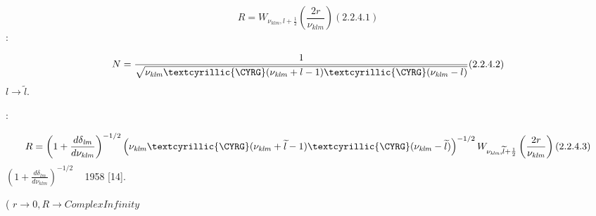 \documentclass[a4paper]{article}
\begin{document}
{\CYRD}{\cyrl}{\cyrya} {\cyrn}{\cyra}{\cyrs} {\cyrn}{\cyra}{\cyri}{\cyrb}{\cyro}{\cyrl}{\cyre}{\cyre}
{\cyrp}{\cyro}{\cyrd}{\cyrh}{\cyro}{\cyrd}{\cyrya}{\cyrshch}{\cyri}{\cyrm} {\cyrb}{\cyru}{\cyrd}{\cyre}{\cyrt}
{\cyrr}{\cyre}{\cyrsh}{\cyre}{\cyrn}{\cyri}{\cyre}

\begin{equation*}
R=W_{\nu _{\mathit{klm}},l+\frac 1 2}\left(\frac{2r}{\nu _{\mathit{klm}}}\right)(2.2.4.1)
\end{equation*}
{\CYRP}{\cyrr}{\cyri} {\cyrerev}{\cyrt}{\cyro}{\cyrm}
{\cyrn}{\cyro}{\cyrr}{\cyrm}{\cyri}{\cyrr}{\cyro}{\cyrv}{\cyro}{\cyrch}{\cyrn}{\cyrery}{\cyrishrt}
{\cyrf}{\cyra}{\cyrk}{\cyrt}{\cyro}{\cyrr} {\cyrb}{\cyru}{\cyrd}{\cyre}{\cyrt}:

\begin{equation*}
N=\frac 1{\sqrt{\nu _{\mathit{klm}}\text{\textcyrillic{{\CYRG}}}(\nu
_{\mathit{klm}}+l-1)\text{\textcyrillic{{\CYRG}}}(\nu _{\mathit{klm}}-l)}}(2.2.4.2)
\end{equation*}
{\CYRV} {\cyrn}{\cyra}{\cyrsh}{\cyri}{\cyrh} {\cyrr}{\cyra}{\cyrs}{\cyrch}{\cyre}{\cyrt}{\cyra}{\cyrh}  $l\rightarrow
\widetilde l$.

{\CYRK}{\cyro}{\cyrn}{\cyre}{\cyrch}{\cyrn}{\cyrery}{\cyrishrt} {\cyrv}{\cyri}{\cyrd}
{\cyrr}{\cyra}{\cyrd}{\cyri}{\cyra}{\cyrl}{\cyrsftsn}{\cyrn}{\cyro}{\cyrishrt} {\cyrch}{\cyra}{\cyrs}{\cyrt}{\cyri}
{\cyrb}{\cyru}{\cyrd}{\cyre}{\cyrt} {\cyrs}{\cyrl}{\cyre}{\cyrd}{\cyru}{\cyryu}{\cyrshch}{\cyri}{\cyrm}:

\begin{equation*}
R=\left(1+\frac{d\delta _{\mathit{lm}}}{d\nu _{\mathit{klm}}}\right)^{-1/2}\left(\nu
_{\mathit{klm}}\text{\textcyrillic{{\CYRG}}}(\nu _{\mathit{klm}}+\widetilde l-1)\text{\textcyrillic{{\CYRG}}}(\nu
_{\mathit{klm}}-\widetilde l)\right)^{-1/2}W_{\nu _{\mathit{klm}},\widetilde l+\frac 1 2}\left(\frac{2r}{\nu
_{\mathit{klm}}}\right)(2.2.4.3)
\end{equation*}
{\CYRN}{\cyro}{\cyrr}{\cyrm}{\cyri}{\cyrr}{\cyro}{\cyrv}{\cyro}{\cyrch}{\cyrn}{\cyrery}{\cyrishrt}
{\cyrf}{\cyra}{\cyrk}{\cyrt}{\cyro}{\cyrr}  $\left(1+\frac{d\delta _{\mathit{lm}}}{d\nu _{\mathit{klm}}}\right)^{-1/2}$
{\cyrb}{\cyrery}{\cyrl} {\cyrp}{\cyrr}{\cyre}{\cyrd}{\cyrl}{\cyro}{\cyrzh}{\cyre}{\cyrn} {\cyri}
{\cyrv}{\cyrery}{\cyrv}{\cyre}{\cyrd}{\cyre}{\cyrn} {\CYRS}{\cyri}{\cyrt}{\cyro}{\cyrn}{\cyro}{\cyrm} \ {\cyrv}
{\cyrs}{\cyrt}{\cyra}{\cyrt}{\cyrsftsn}{\cyre} 1958 [14].

{\CYRR}{\cyra}{\cyrs}{\cyrs}{\cyrm}{\cyro}{\cyrt}{\cyrr}{\cyri}{\cyrm}
{\cyro}{\cyrt}{\cyrd}{\cyre}{\cyrl}{\cyrsftsn}{\cyrn}{\cyro} {\cyrp}{\cyrr}{\cyro}{\cyrb}{\cyrl}{\cyre}{\cyrm}{\cyru}
{\cyrs} {\cyrn}{\cyre}{\cyrv}{\cyrery}{\cyrp}{\cyro}{\cyrl}{\cyrn}{\cyre}{\cyrn}{\cyri}{\cyre}{\cyrm}
{\cyrg}{\cyrr}{\cyra}{\cyrn}{\cyri}{\cyrch}{\cyrn}{\cyrery}{\cyrh}
{\cyru}{\cyrs}{\cyrl}{\cyro}{\cyrv}{\cyri}{\cyrishrt} \newline
({\cyrp}{\cyrr}{\cyri}  $r\rightarrow 0,R\rightarrow \mathit{ComplexInfinity}$
\end{document}
